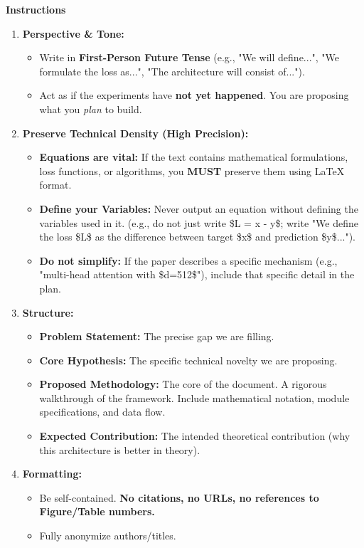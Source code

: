 \vspace{1em}
\noindent\textbf{Instructions}
\begin{enumerate}
    \item \textbf{Perspective \& Tone:}
    \begin{itemize}
        \item Write in \textbf{First-Person Future Tense} (e.g., "We will define...", "We formulate the loss as...", "The architecture will consist of...").
        \item Act as if the experiments have \textbf{not yet happened}. You are proposing what you \textit{plan} to build.
    \end{itemize}
    \item \textbf{Preserve Technical Density (High Precision):}
    \begin{itemize}
        \item \textbf{Equations are vital:} If the text contains mathematical formulations, loss functions, or algorithms, you \textbf{MUST} preserve them using LaTeX format.
        \item \textbf{Define your Variables:} Never output an equation without defining the variables used in it. (e.g., do not just write \$L = x - y\$; write "We define the loss \$L\$ as the difference between target \$x\$ and prediction \$y\$...").
        \item \textbf{Do not simplify:} If the paper describes a specific mechanism (e.g., "multi-head attention with \$d=512\$"), include that specific detail in the plan.
    \end{itemize}
    \item \textbf{Structure:}
    \begin{itemize}
        \item \textbf{Problem Statement:} The precise gap we are filling.
        \item \textbf{Core Hypothesis:} The specific technical novelty we are proposing.
        \item \textbf{Proposed Methodology:} The core of the document. A rigorous walkthrough of the framework. Include mathematical notation, module specifications, and data flow.
        \item \textbf{Expected Contribution:} The intended theoretical contribution (why this architecture is better in theory).
    \end{itemize}
    \item \textbf{Formatting:}
    \begin{itemize}
        \item Be self-contained. \textbf{No citations, no URLs, no references to Figure/Table numbers.}
        \item Fully anonymize authors/titles.
    \end{itemize}
\end{enumerate}

